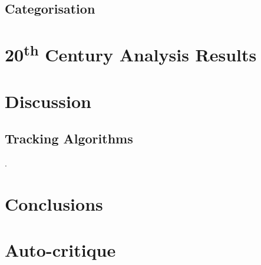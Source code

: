 \documentclass[pdftex,12pt,a4paper]{report}
\newcommand{\ts}{\textsuperscript}
\begin{document}



\section{Categorisation}


\chapter{20\ts{th} Century Analysis Results}

\chapter{Discussion}

\section{Tracking Algorithms}
\label{sec:discussion_tracking_algs}.

\chapter{Conclusions}

\chapter*{Auto-critique}

\printbibliography[title={References}]

\end{document}
